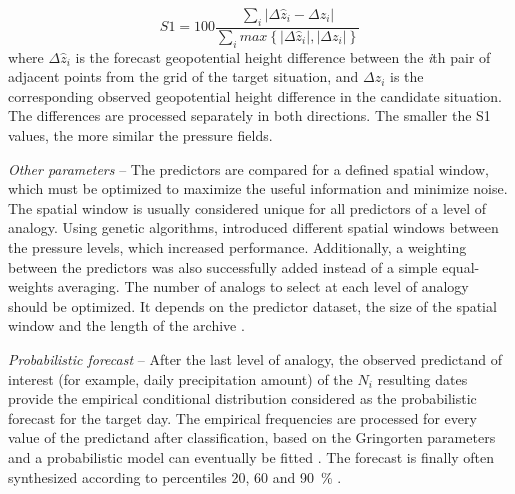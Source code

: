 \documentclass[review]{elsarticle}
\begin{document}
\begin{equation}
\label{eq:S1}
S1=100 \frac {\displaystyle \sum_{i} \vert \Delta\hat{z}_{i} - \Delta z_{i} \vert}
{\displaystyle \sum_{i} max\left\lbrace \vert \Delta\hat{z}_{i} \vert , \vert \Delta z_{i} \vert \right\rbrace }
\end{equation}
where $\Delta \hat{z}_{i}$ is the forecast geopotential height difference between the \textit{i}th pair of adjacent points from the grid of the target situation, and $\Delta z_{i}$ is the corresponding observed geopotential height difference in the candidate situation. The differences are processed separately in both directions. The smaller the S1 values, the more similar the pressure fields.

\textit{Other parameters} -- The predictors are compared for a defined spatial window, which must be optimized to maximize the useful information and minimize noise. The spatial window is usually considered unique for all predictors of a level of analogy. Using genetic algorithms, \citet{Horton2018a} introduced different spatial windows between the pressure levels, which increased performance. Additionally, a weighting between the predictors was also successfully added instead of a simple equal-weights averaging. The number of analogs to select at each level of analogy should be optimized. It depends on the predictor dataset, the size of the spatial window and the length of the archive \citet{Ruosteenoja1988, Vandendool1994}.

\textit{Probabilistic forecast} -- After the last level of analogy, the observed predictand of interest (for example, daily precipitation amount) of the $N_{i}$ resulting dates provide the empirical conditional distribution considered as the probabilistic forecast for the target day. The empirical frequencies are processed for every value of the predictand after classification, based on the Gringorten parameters \cite[for a Gumbel or exponential law; see][]{Gringorten1963} and a probabilistic model can eventually be fitted \citep[e.g. Gamma function,][]{Obled2002}. The forecast is finally often synthesized according to percentiles 20, 60 and 90~\% \citep{Guilbaud1997, Guilbaud1998}.
\end{document}
